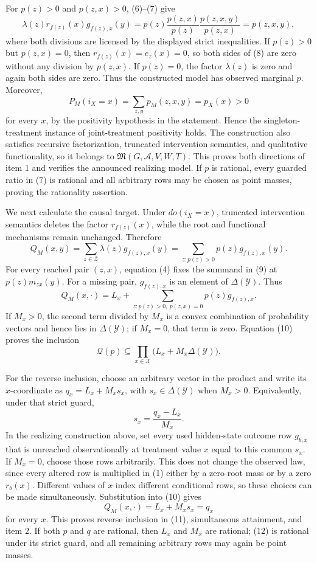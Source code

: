 For \(p(z)>0\) and \(p(z,x)>0\), (6)--(7) give
\[
 \lambda(z)r_{f(z)}(x)g_{f(z),x}(y)
 =p(z)\frac{p(z,x)}{p(z)}
       \frac{p(z,x,y)}{p(z,x)}
 =p(z,x,y),
\tag{8}
\]
where both divisions are licensed by the displayed strict inequalities.
If \(p(z)>0\) but \(p(z,x)=0\), then
\(r_{f(z)}(x)=e_z(x)=0\), so both sides of (8) are zero without any
division by \(p(z,x)\).  If \(p(z)=0\), the factor \(\lambda(z)\) is
zero and again both sides are zero.  Thus the constructed model has
observed marginal \(p\).  Moreover,
\[
 P_M(i_X=x)=\sum_{z,y}p_M(z,x,y)=p_X(x)>0
\]
for every \(x\), by the positivity hypothesis in the statement.  Hence
the singleton-treatment instance of joint-treatment positivity holds.
The construction also satisfies recursive factorization, truncated
intervention semantics, and qualitative functionality, so it belongs to
\(\mathfrak M(G,\mathcal A,V,W,T)\).  This proves both directions of
item 1 and verifies the announced realizing model.  If \(p\) is
rational, every guarded ratio in (7) is rational and all arbitrary rows
may be chosen as point masses, proving the rationality assertion.

We next calculate the causal target.  Under \(do(i_X=x)\), truncated
intervention semantics deletes the factor \(r_{f(z)}(x)\), while the
root and functional mechanisms remain unchanged.  Therefore
\[
 Q_M(x,y)=\sum_{z\in\mathcal Z}\lambda(z)g_{f(z),x}(y)
         =\sum_{z:p(z)>0}p(z)g_{f(z),x}(y).
\tag{9}
\]
For every reached pair \((z,x)\), equation (4) fixes the summand in (9)
at \(p(z)m_{zx}(y)\).  For a missing pair, \(g_{f(z),x}\) is an element
of \(\Delta(\mathcal Y)\).  Thus
\[
 Q_M(x,\cdot)
 =L_x+\sum_{z:p(z)>0,\ p(z,x)=0}p(z)g_{f(z),x}.
\tag{10}
\]
If \(M_x>0\), the second term divided by \(M_x\) is a convex
combination of probability vectors and hence lies in
\(\Delta(\mathcal Y)\); if \(M_x=0\), that term is zero.  Equation
(10) proves the inclusion
\[
 \mathcal Q(p)\subseteq
 \prod_{x\in\mathcal X}\bigl(L_x+M_x\Delta(\mathcal Y)\bigr).
\tag{11}
\]

For the reverse inclusion, choose an arbitrary vector in the product and
write its \(x\)-coordinate as \(q_x=L_x+M_xs_x\), with
\(s_x\in\Delta(\mathcal Y)\) when \(M_x>0\).  Equivalently, under that
strict guard,
\[
 s_x=\frac{q_x-L_x}{M_x}.
\tag{12}
\]
In the realizing construction above, set every used hidden-state outcome
row \(g_{b,x}\) that is unreached observationally at treatment value
\(x\) equal to this common \(s_x\).  If \(M_x=0\), choose those rows
arbitrarily.  This does not change the observed law, since every altered
row is multiplied in (1) either by a zero root mass or by a zero
\(r_b(x)\).  Different values of \(x\) index different conditional rows,
so these choices can be made simultaneously.  Substitution into (10)
gives
\[
 Q_M(x,\cdot)=L_x+M_xs_x=q_x
\]
for every \(x\).  This proves reverse inclusion in (11), simultaneous
attainment, and item 2.  If both \(p\) and \(q\) are rational, then
\(L_x\) and \(M_x\) are rational; (12) is rational under its strict
guard, and all remaining arbitrary rows may again be point masses.

